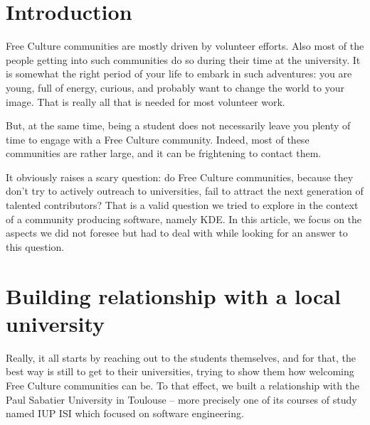 

\section*{Introduction}
Free Culture communities are mostly driven by volunteer efforts. Also
most of the people getting into such communities do so during their time at the
university. It is somewhat the right period of your life to embark in such
adventures: you are young, full of energy, curious, and probably want to change
the world to your image. That is really all that is needed for most volunteer
work.

But, at the same time, being a student does not necessarily leave you plenty of
time to engage with a Free Culture community. Indeed, most of these communities
are rather large, and it can be frightening to contact them.

It obviously raises a scary question: do Free Culture communities, because they
don't try to actively outreach to universities, fail to attract the next generation
of talented contributors?
That is a valid question we tried to explore in the context of a community
producing software, namely KDE. In this article, we focus on the aspects we did
not foresee but had to deal with while looking for an answer to this question.

\section*{Building relationship with a local university}
Really, it all starts by reaching out to the students themselves, and for that,
the best way is still to get to their universities, trying to show them how
welcoming Free Culture communities can be. To that effect, we built a
relationship with the Paul Sabatier University in Toulouse -- more precisely one
of its courses of study named IUP ISI which focused on software engineering.

